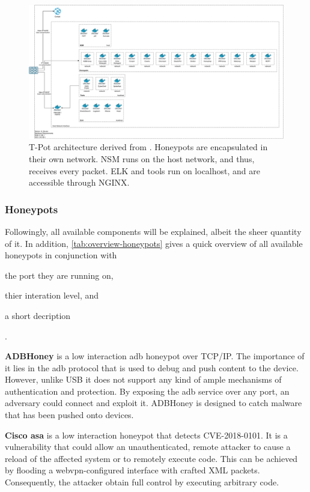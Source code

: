 \begin{figure}
    \centering
    \includegraphics[width=\textwidth]{figures/tpot-architecture.pdf}
    \caption[T-Pot architecture]{T-Pot architecture derived from \cite{tpot2021}. Honeypots are encapsulated in their own network. NSM runs on the host network, and thus, receives every packet. ELK and tools run on localhost, and are accessible through NGINX.}
    \label{fig:overview-tpot}
\end{figure}

\subsubsection{Honeypots}

Followingly, all available components will be explained, albeit the sheer quantity of it.
In addition, \autoref{tab:overview-honeypots} gives a quick overview of all available honeypots in conjunction with
\begin{enumerate*}[label=(\roman*)]
    \item the port they are running on,
    \item thier interation level, and
    \item a short decription
\end{enumerate*}.

\textbf{ADBHoney} \cite{adbhoney2021} is a low interaction \ac{adb} honeypot over TCP/IP.
The importance of it lies in the \ac{adb} protocol that is used to debug and push content to the device.
However, unlike USB it does not support any kind of ample mechanisms of authentication and protection.
By exposing the \ac{adb} service over any port, an adversary could connect and exploit it.
ADBHoney is designed to catch malware that has been pushed onto devices.

\textbf{Cisco \ac{asa}} \cite{cymmetria2018} is a low interaction honeypot that detects CVE-2018-0101\cite{CVE-2018-0101}.
It is a vulnerability that could allow an unauthenticated, remote attacker to cause a reload of the affected system or to remotely execute code.
This can be achieved by flooding a webvpn-configured interface with crafted XML packets.
Consequently, the attacker obtain full control by executing arbitrary code.

